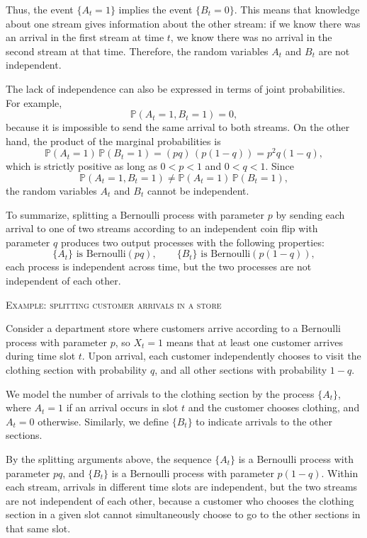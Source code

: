 Thus, the event \(\{A_t = 1\}\) implies the event \(\{B_t = 0\}\).  
This means that knowledge about one stream gives information about the other stream: if we know there was an arrival in the first stream at time \(t\), we know there was no arrival in the second stream at that time.  
Therefore, the random variables \(A_t\) and \(B_t\) are not independent.  

The lack of independence can also be expressed in terms of joint probabilities.  
For example,
\[
\mathbb{P}(A_t = 1, B_t = 1) = 0,
\]
because it is impossible to send the same arrival to both streams.  
On the other hand, the product of the marginal probabilities is
\[
\mathbb{P}(A_t = 1)\,\mathbb{P}(B_t = 1)
=
(p q)\, (p (1-q))
=
p^{2} q (1-q),
\]
which is strictly positive as long as \(0 < p < 1\) and \(0 < q < 1\).  
Since
\[
\mathbb{P}(A_t = 1, B_t = 1) \neq \mathbb{P}(A_t = 1)\,\mathbb{P}(B_t = 1),
\]
the random variables \(A_t\) and \(B_t\) cannot be independent.  

To summarize, splitting a Bernoulli process with parameter \(p\) by sending each arrival to one of two streams according to an independent coin flip with parameter \(q\) produces two output processes with the following properties:
\[
\{A_t\} \text{ is Bernoulli}(p q),
\qquad
\{B_t\} \text{ is Bernoulli}(p (1-q)),
\]
each process is independent across time, but the two processes are not independent of each other.  

\bigskip
\textsc{Example: splitting customer arrivals in a store}

Consider a department store where customers arrive according to a Bernoulli process with parameter \(p\), so \(X_t = 1\) means that at least one customer arrives during time slot \(t\).  
Upon arrival, each customer independently chooses to visit the clothing section with probability \(q\), and all other sections with probability \(1 - q\).  

We model the number of arrivals to the clothing section by the process \(\{A_t\}\), where \(A_t = 1\) if an arrival occurs in slot \(t\) and the customer chooses clothing, and \(A_t = 0\) otherwise.  
Similarly, we define \(\{B_t\}\) to indicate arrivals to the other sections.  

By the splitting arguments above, the sequence \(\{A_t\}\) is a Bernoulli process with parameter \(p q\), and \(\{B_t\}\) is a Bernoulli process with parameter \(p (1 - q)\).  
Within each stream, arrivals in different time slots are independent, but the two streams are not independent of each other, because a customer who chooses the clothing section in a given slot cannot simultaneously choose to go to the other sections in that same slot.


